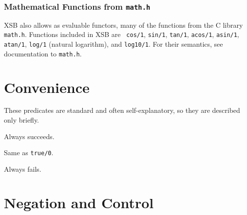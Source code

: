 \subsubsection{Mathematical Functions from {\tt math.h}}
  
  
 

XSB also allows as evaluable functors, many of the functions from the
C library {\tt math.h}.  Functions included in XSB \version{} are {\tt
  cos/1}, {\tt sin/1}, {\tt tan/1}, {\tt acos/1}, {\tt asin/1}, {\tt
  atan/1}, {\tt log/1} (natural logarithm), and {\tt log10/1}.  For
  their semantics, see documentation to {\tt math.h}.

\section{Convenience} \label{Convenience}
These predicates are standard and often self-explanatory, so they are 
described only briefly.
\begin{description}

    Always succeeds.

    Same as {\tt true/0}.

    Always fails.

\end{description}

\section{Negation and Control}\label{sec:control}

